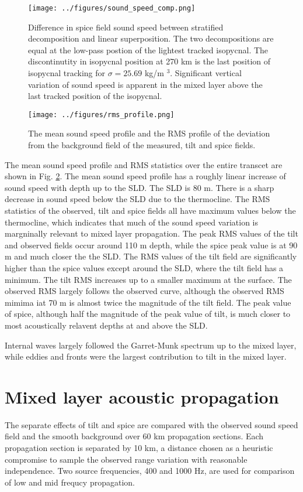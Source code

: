 \documentclass[preprint,NumberedRefs]{JASA}
\begin{document}
\begin{figure}
\texttt{[image: ../figures/sound\_speed\_comp.png]}
    \caption{\label{fig:c_diff}{Difference in spice field sound speed between stratified decomposition and linear superposition. The two decompositions are equal at the low-pass postion of the lightest tracked isopycnal. The discontinutity in isopycnal position at 270 km is the last position of isopycnal tracking for $\sigma=25.69$ kg/m $^3$. Significant vertical variation of sound speed is apparent in the mixed layer above the last tracked position of the isopycnal.}}
\end{figure}


\begin{figure}
\texttt{[image: ../figures/rms\_profile.png]}
    \caption{\label{fig:c_rms}{The mean sound speed profile and the RMS profile of the deviation from the background field of the measured, tilt and spice fields. }}
\end{figure}

The mean sound speed profile and RMS statistics over the entire transcet are shown in Fig. \ref{fig:c_rms}. The mean sound speed profile has a roughly linear increase of sound speed with depth up to the SLD. The SLD is 80 m. There is a sharp decrease in sound speed below the SLD due to the thermocline. The RMS statistics of the observed, tilt and spice fields all have maximum values below the thermocline, which indicates that much of the sound speed variation is margninally relevant to mixed layer propagation. The peak RMS values of the tilt and observed fields occur around 110 m depth, while the spice peak value is at 90 m and much closer the the SLD. The RMS values of the tilt field are significantly higher than the spice values except around the SLD, where the tilt field has a minimum. The tilt RMS increases up to a smaller maximum at the surface. The observed RMS largely follows the observed curve, although the observed RMS mimima iat 70 m is almost twice the magnitude of the tilt field. The peak value of spice, although half the magnitude of the peak value of tilt, is much closer to most acoustically relavent depths at and above the SLD.

Internal waves largely followed the Garret-Munk spectrum up to the mixed layer, while eddies and fronts were the largest contribution to tilt in the mixed layer.

\section{\label{sec:propagation}Mixed layer acoustic propagation}
The separate effects of tilt and spice are compared with the observed sound speed field and the smooth background over 60 km propagation sections. Each propagation section is separated by 10 km, a distance chosen as a heuristic compromise to sample the observed range variation with reasonable independence. Two source frequencies, 400 and 1000 Hz, are used for comparison of low and mid frequcy propagation.
\end{document}
